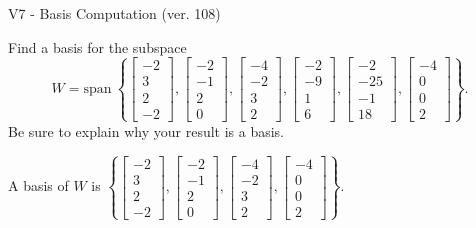 \begin{exercise}
  \begin{exerciseTitle}V7 - Basis Computation (ver. 108)\end{exerciseTitle}
  \begin{exerciseStatement}
    Find a basis for the subspace 
\[W=\mathrm{span}\ \left\{\left[\begin{array}{r}
-2 \\
3 \\
2 \\
-2
\end{array}\right] , \left[\begin{array}{r}
-2 \\
-1 \\
2 \\
0
\end{array}\right] , \left[\begin{array}{r}
-4 \\
-2 \\
3 \\
2
\end{array}\right] , \left[\begin{array}{r}
-2 \\
-9 \\
1 \\
6
\end{array}\right] , \left[\begin{array}{r}
-2 \\
-25 \\
-1 \\
18
\end{array}\right] , \left[\begin{array}{r}
-4 \\
0 \\
0 \\
2
\end{array}\right]\right\}.\]
 Be sure to explain why your result is a basis.


  \end{exerciseStatement}
  \begin{exerciseAnswer}
   A basis of \(W\) is  \(\left\{\left[\begin{array}{r}
-2 \\
3 \\
2 \\
-2
\end{array}\right] , \left[\begin{array}{r}
-2 \\
-1 \\
2 \\
0
\end{array}\right] , \left[\begin{array}{r}
-4 \\
-2 \\
3 \\
2
\end{array}\right] , \left[\begin{array}{r}
-4 \\
0 \\
0 \\
2
\end{array}\right]\right\}\).
  


  \end{exerciseAnswer}
\end{exercise}